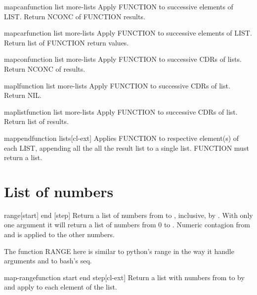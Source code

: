 \documentclass[10pt,english]{book}
\begin{document}
\begin{function}{mapcan}{function list \rest more-lists}
  Apply FUNCTION to successive elements of LIST. Return NCONC of FUNCTION
   results.
\end{function}

\begin{function}{mapcar}{function list \rest more-lists}
  Apply FUNCTION to successive elements of LIST. Return list of FUNCTION
   return values.
\end{function}

\begin{function}{mapcon}{function list \rest more-lists}
  Apply FUNCTION to successive CDRs of lists. Return NCONC of results.
\end{function}

\begin{function}{mapl}{function list \rest more-lists}
  Apply FUNCTION to successive CDRs of list. Return NIL.
\end{function}

\begin{function}{maplist}{function list \rest more-lists}
  Apply FUNCTION to successive CDRs of list. Return list of results.
\end{function}

\begin{function}{mappend}{function \rest lists}[cl-ext]
  Applies FUNCTION to respective element(s) of each LIST, appending all the
all the result list to a single list. FUNCTION must return a list.
\end{function}

\section{List of numbers}
\label{sec:list-numbers}

\begin{function}{range}{[start] end [step]}
  Return a list of numbers from  to , inclusive,
  by . With only one argument it will return a list of
  numbers from 0 to . Numeric contagion from  and
   is applied to the other numbers.
\begin{devnote}
  The function RANGE here is similar to python's range in the way it
  handle arguments and to bash's seq.
\end{devnote}
\end{function}

\begin{function}{map-range}{function start end \op step}[cl-ext]
  Return a list with numbers from  to  by 
  and apply  to each element of the list.
\end{function}
\end{document}
